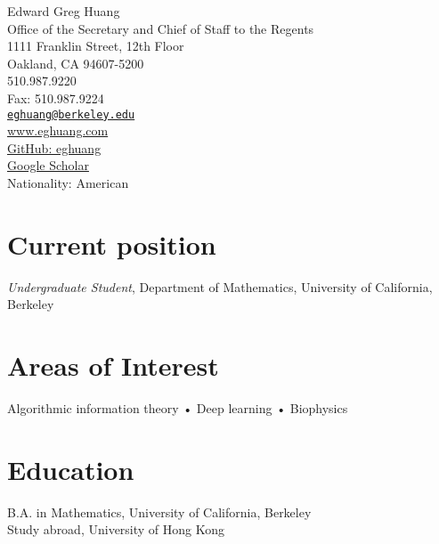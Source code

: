 \documentclass[10pt, letterpaper]{article}
\newcommand{\years}[1]{\marginnote{\scriptsize #1}}
\begin{document}
{\LARGE Edward Greg Huang}\\[1cm]
Office of the Secretary and Chief of Staff to the Regents \\
1111 Franklin Street, 12th Floor \\
Oakland, CA 94607-5200 \\
510.987.9220\\
Fax: 510.987.9224\\


\href{mailto:eghuang@berkeley.edu}{\lstinline{eghuang@berkeley.edu}}\\
\href{https://www.eghuang.com}{www.eghuang.com}\\
\href{https://github.com/eghuang}{GitHub: eghuang}\\
\href{https://scholar.google.com/citations?user=DlUurWMAAAAJ}{Google Scholar}\\

Nationality: American

\section*{Current position}
\emph{Undergraduate Student}, Department of Mathematics, University of California, Berkeley

\section*{Areas of Interest}
 Algorithmic information theory • Deep learning • Biophysics 

\section*{Education}
\noindent
\years{2019}\textsc{B.A.} in Mathematics, University of California, Berkeley\\
\years{2016}Study abroad, University of Hong Kong\\


\end{document}
